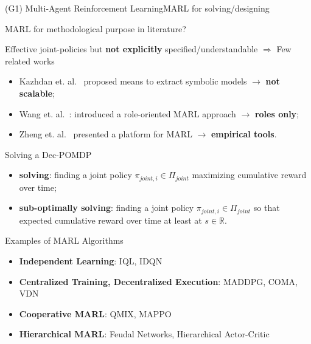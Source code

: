 \begin{frame}{(G1) Multi-Agent Reinforcement Learning}{MARL for solving/designing}

    \begin{block}{MARL for methodological purpose in literature?}

        Effective joint-policies but \textbf{not explicitly} specified/understandable
        $\Longrightarrow$ Few related works
            {\small
                \begin{itemize}
                    \item Kazhdan et. al.~\cite{Kazhdan2020} proposed means to extract symbolic models $\rightarrow$ \textbf{not scalable};
                    \item Wang et. al.~\cite{Wang2020}: introduced a role-oriented MARL approach $\rightarrow$ \textbf{roles only};
                    \item Zheng et. al.~\cite{Zheng2018} presented a platform for MARL $\rightarrow$ \textbf{empirical tools}.
                \end{itemize}
            }
    \end{block}

    \begin{block}{Solving a Dec-POMDP}
        \begin{itemize}
            \item \textbf{solving}: finding a joint policy $\pi_{joint,i} \in \Pi_{joint}$ maximizing cumulative reward over time;
            \item \textbf{sub-optimally solving}: finding a joint policy $\pi_{joint,i} \in \Pi_{joint}$ so that expected cumulative reward over time at least at $s \in \mathbb{R}$.
        \end{itemize}
    \end{block}

    \begin{exampleblock}{Examples of MARL Algorithms}
        {\footnotesize

            \centering
            \begin{minipage}{0.5\textwidth}
                \centering
                \begin{itemize}
                    \item \textbf{Independent Learning}: IQL, IDQN
                    \item \textbf{Centralized Training, Decentralized Execution}: MADDPG, COMA, VDN
                \end{itemize}
            \end{minipage}\hfill
            \begin{minipage}{0.5\textwidth}
                \centering
                \begin{itemize}
                    \item \textbf{Cooperative MARL}: QMIX, MAPPO
                    \item \textbf{Hierarchical MARL}: Feudal Networks, Hierarchical Actor-Critic
                \end{itemize}
            \end{minipage}\hfill
        }
    \end{exampleblock}


\end{frame}

